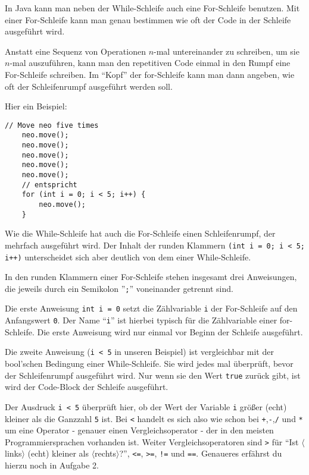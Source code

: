 

\begin{Infobox}
	In Java kann man neben der While-Schleife auch eine For-Schleife benutzen.
	Mit einer For-Schleife kann man genau bestimmen wie oft der Code in der Schleife ausgeführt wird.\newline

	Anstatt eine Sequenz von Operationen $n$-mal untereinander zu schreiben, um sie $n$-mal auszuführen, kann man den repetitiven Code einmal in den Rumpf eine For-Schleife schreiben.
	Im \enquote{Kopf} der for-Schleife kann man dann angeben, wie oft der Schleifenrumpf ausgeführt werden soll.\newline

	Hier ein Beispiel:

	\begin{lstlisting}[numbers=none]
	// Move neo five times
	neo.move();
	neo.move();
	neo.move();
	neo.move();
	neo.move();
	// entspricht
	for (int i = 0; i < 5; i++) {
		neo.move();
	}
	\end{lstlisting}

	Wie die While-Schleife hat auch die For-Schleife einen Schleifenrumpf, der mehrfach ausgeführt wird.
	Der Inhalt der runden Klammern \lstinline{(int i = 0; i < 5; i++)} unterscheidet sich aber deutlich von dem einer While-Schleife.\newline

	In den runden Klammern einer For-Schleife stehen insgesamt drei Anweisungen, die jeweils durch ein Semikolon ''\lstinline{;}'' voneinander getrennt sind.

	Die erste Anweisung \lstinline{int i = 0} setzt die Zählvariable \lstinline{i} der For-Schleife auf den Anfangswert \lstinline{0}.
	Der Name \enquote{\lstinline{i}} ist hierbei typisch für die Zählvariable einer for-Schleife.
	Die erste Anweisung wird nur einmal vor Beginn der Schleife ausgeführt.\newline

	Die zweite Anweisung (\lstinline{i < 5} in unseren Beispiel) ist vergleichbar mit der bool'schen Bedingung einer While-Schleife.
	Sie wird jedes mal überprüft, bevor der Schleifenrumpf ausgeführt wird.
	Nur wenn sie den Wert \lstinline{true} zurück gibt, ist wird der Code-Block der Schleife ausgeführt.\newline

	Der Ausdruck \lstinline{i < 5} überprüft hier, ob der Wert der Variable \texttt{i} größer (echt) kleiner als die Ganzzahl \texttt{5} ist.
	Bei \texttt{<} handelt es sich also wie schon bei \texttt{+},\texttt{-},\texttt{/} und \texttt{*} um eine Operator - genauer einen Vergleichsoperator - der in den meisten Programmiersprachen vorhanden ist.
	Weiter Vergleichsoperatoren sind \texttt{>} für \enquote{Ist $\langle$links$\rangle$ (echt) kleiner als $\langle$rechts$\rangle$?}, \texttt{<=}, \texttt{>=}, \texttt{!=} und \texttt{==}.
	Genaueres erfährst du hierzu noch in Aufgabe 2.\newline


\end{Infobox}
